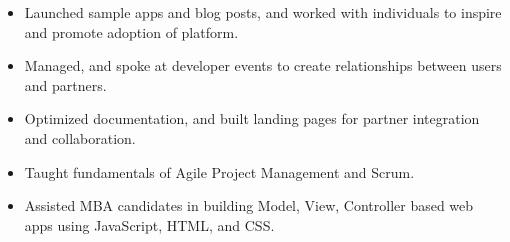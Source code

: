 \documentclass[10pt,a4paper,ragged2e]{altacv}
\begin{document}

\makecvheader



\begin{itemize}
\item Launched sample apps and blog posts, and worked with individuals to inspire and promote adoption of platform.
\item Managed, and spoke at developer events to create relationships between users and partners.
\item Optimized documentation, and built landing pages for partner integration and collaboration.
\end{itemize}
\divider

\begin{itemize}
\item Taught fundamentals of Agile Project Management and Scrum.
\item Assisted MBA candidates in building Model, View, Controller based web apps using JavaScript, HTML, and CSS.
\end{itemize}
\divider
\end{document}
